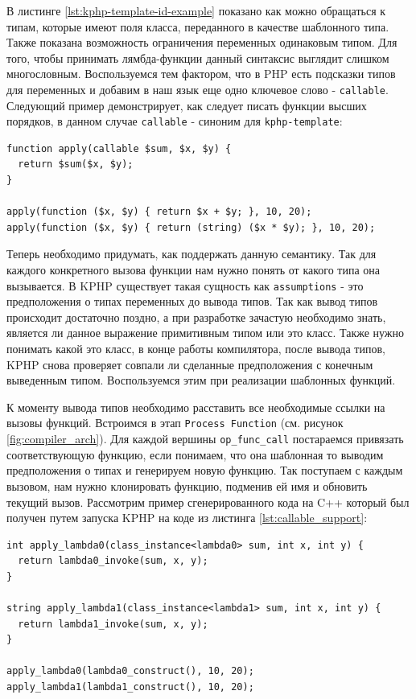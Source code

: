 В листинге \ref{lst:kphp-template-id-example} показано как можно обращаться к типам, которые имеют поля класса, переданного в качестве шаблонного типа.
Также показана возможность ограничения переменных одинаковым типом.
Для того, чтобы принимать лямбда-функции данный синтаксис выглядит слишком многословным.
Воспользуемся тем фактором, что в PHP есть подсказки типов для переменных и добавим в наш язык еще одно ключевое слово - \verb|callable|.
Следующий пример демонстрирует, как следует писать функции высших порядков, в данном случае \verb|callable| - синоним для \verb|kphp-template|:
\begin{lstlisting}[caption={Пример использования ключевого слова callable},label={lst:callable_support}]
function apply(callable $sum, $x, $y) {
  return $sum($x, $y);
}

apply(function ($x, $y) { return $x + $y; }, 10, 20);
apply(function ($x, $y) { return (string) ($x * $y); }, 10, 20);
\end{lstlisting}

Теперь необходимо придумать, как поддержать данную семантику.
Так для каждого конкретного вызова функции нам нужно понять от какого типа она вызывается.
В KPHP существует такая сущность как \verb|assumptions| - это предположения о типах переменных до вывода типов.
Так как вывод типов происходит достаточно поздно, а при разработке зачастую необходимо знать, является ли данное выражение примитивным типом или это класс.
Также нужно понимать какой это класс, в конце работы компилятора, после вывода типов, KPHP снова проверяет совпали ли сделанные предположения с конечным выведенным типом.
Воспользуемся этим при реализации шаблонных функций.

К моменту вывода типов необходимо расставить все необходимые ссылки на вызовы функций.
Встроимся в этап \verb|Process Function| (см. рисунок \ref{fig:compiler_arch}).
Для каждой вершины \verb|op_func_call| постараемся привязать соответствующую функцию, если понимаем, что она шаблонная то выводим предположения о типах и генерируем новую функцию.
Так поступаем с каждым вызовом, нам нужно клонировать функцию, подменив ей имя и обновить текущий вызов.
Рассмотрим пример сгенерированного кода на C++ который был получен путем запуска KPHP на коде из листинга \ref{lst:callable_support}:
\begin{lstlisting}
int apply_lambda0(class_instance<lambda0> sum, int x, int y) {
  return lambda0_invoke(sum, x, y);
}

string apply_lambda1(class_instance<lambda1> sum, int x, int y) {
  return lambda1_invoke(sum, x, y);
}

apply_lambda0(lambda0_construct(), 10, 20);
apply_lambda1(lambda1_construct(), 10, 20);
\end{lstlisting}

